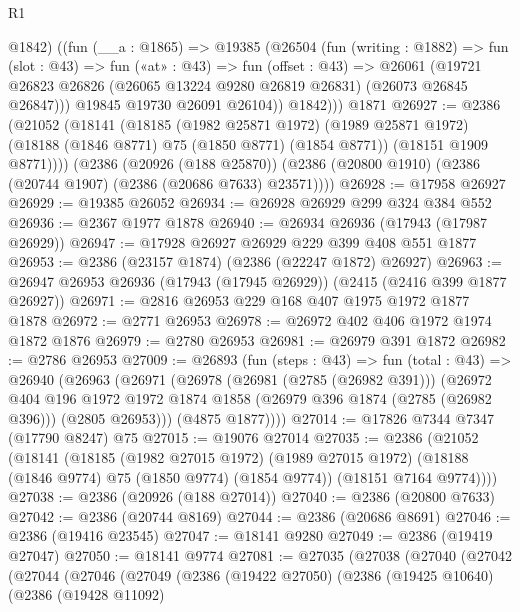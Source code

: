 \begin{lexlean}{R1}
\begin{coremodule}
          @1842)
        ((fun (__a : @1865) =>
        @19385
          (@26504
            (fun (writing : @1882) =>
            fun (slot : @43) =>
            fun («at» : @43) =>
            fun (offset : @43) =>
            @26061
              (@19721 @26823 @26826 (@26065 @13224 @9280 @26819 @26831) (@26073 @26845 @26847)))
            @19845
            @19730
            @26091
            @26104))
          @1842)))
    @1871
@26927 := @2386
    (@21052
      (@18141
        (@18185
          (@1982 @25871 @1972)
          (@1989 @25871 @1972)
          (@18188 (@1846 @8771) @75 (@1850 @8771) (@1854 @8771))
          (@18151 @1909 @8771))))
    (@2386
      (@20926 (@188 @25870))
      (@2386 (@20800 @1910) (@2386 (@20744 @1907) (@2386 (@20686 @7633) @23571))))
@26928 := @17958 @26927
@26929 := @19385 @26052
@26934 := @26928 @26929 @299 @324 @384 @552
@26936 := @2367 @1977 @1878
@26940 := @26934 @26936 (@17943 (@17987 @26929))
@26947 := @17928 @26927 @26929 @229 @399 @408 @551 @1877
@26953 := @2386 (@23157 @1874) (@2386 (@22247 @1872) @26927)
@26963 := @26947 @26953 @26936 (@17943 (@17945 @26929)) (@2415 (@2416 @399 @1877 @26927))
@26971 := @2816 @26953 @229 @168 @407 @1975 @1972 @1877 @1878
@26972 := @2771 @26953
@26978 := @26972 @402 @406 @1972 @1974 @1872 @1876
@26979 := @2780 @26953
@26981 := @26979 @391 @1872
@26982 := @2786 @26953
@27009 := @26893
    (fun (steps : @43) =>
    fun (total : @43) =>
    @26940
      (@26963
        (@26971
          (@26978
            (@26981 (@2785 (@26982 @391)))
            (@26972
              @404
              @196
              @1972
              @1972
              @1874
              @1858
              (@26979 @396 @1874 (@2785 (@26982 @396)))
              (@2805 @26953)))
          (@4875 @1877))))
@27014 := @17826 @7344 @7347 (@17790 @8247) @75
@27015 := @19076 @27014
@27035 := @2386
    (@21052
      (@18141
        (@18185
          (@1982 @27015 @1972)
          (@1989 @27015 @1972)
          (@18188 (@1846 @9774) @75 (@1850 @9774) (@1854 @9774))
          (@18151 @7164 @9774))))
@27038 := @2386 (@20926 (@188 @27014))
@27040 := @2386 (@20800 @7633)
@27042 := @2386 (@20744 @8169)
@27044 := @2386 (@20686 @8691)
@27046 := @2386 (@19416 @23545)
@27047 := @18141 @9280
@27049 := @2386 (@19419 @27047)
@27050 := @18141 @9774
@27081 := @27035
    (@27038
      (@27040
        (@27042
          (@27044
            (@27046
              (@27049
                (@2386
                  (@19422 @27050)
                  (@2386
                    (@19425 @10640)
                    (@2386
                      (@19428 @11092)

\end{coremodule}
\end{lexlean}
